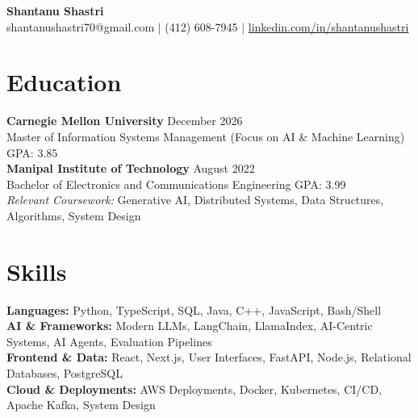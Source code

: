 \documentclass[11pt,a4paper]{article}
\begin{document}
\begin{center}
    \Huge \textbf{Shantanu Shastri} \\
    \vspace{2pt}
    \small shantanushastri70@gmail.com $|$ (412) 608-7945 $|$ \href{https://linkedin.com/in/shantanushastri}{linkedin.com/in/shantanushastri}
\end{center}

\vspace{-5pt}
\section{Education}
\noindent
\textbf{Carnegie Mellon University} \hfill December 2026 \\
Master of Information Systems Management (Focus on AI \& Machine Learning) \hfill GPA: 3.85 \\
\textbf{Manipal Institute of Technology} \hfill August 2022 \\
Bachelor of Electronics and Communications Engineering \hfill GPA: 3.99 \\
\textit{Relevant Coursework:} Generative AI, Distributed Systems, Data Structures, Algorithms, System Design

\vspace{-5pt}
\section{Skills}
\noindent
\textbf{Languages:} Python, TypeScript, SQL, Java, C++, JavaScript, Bash/Shell \\
\textbf{AI \& Frameworks:} Modern LLMs, LangChain, LlamaIndex, AI-Centric Systems, AI Agents, Evaluation Pipelines \\
\textbf{Frontend \& Data:} React, Next.js, User Interfaces, FastAPI, Node.js, Relational Databases, PostgreSQL \\
\textbf{Cloud \& Deployments:} AWS Deployments, Docker, Kubernetes, CI/CD, Apache Kafka, System Design

\vspace{-5pt}
\end{document}
